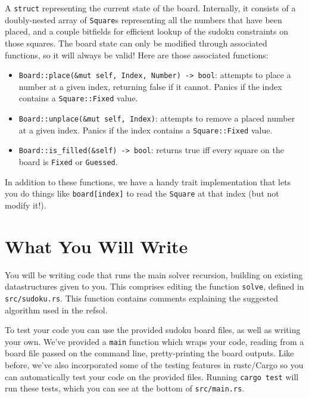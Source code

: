 \documentclass{article}
\begin{document}
A \texttt{struct} representing the current state of the board. Internally, it consists of a doubly-nested array of \texttt{Square}s representing all the numbers that have been placed, and a couple bitfields for efficient lookup of the sudoku constraints on those squares. The board state can only be modified through associated functions, so it will always be valid! Here are those associated functions:
\begin{itemize}
    \item \texttt{Board::place(\&mut self, Index, Number) -> bool}: attempts to place a number at a given index, returning false if it cannot. Panics if the index contains a \texttt{Square::Fixed} value.
    \item \texttt{Board::unplace(\&mut self, Index)}: attempts to remove a placed number at a given index. Panics if the index contains a \texttt{Square::Fixed} value.
    \item \texttt{Board::is\_filled(\&self) -> bool}: returns true iff every square on the board is \texttt{Fixed} or \texttt{Guessed}.
\end{itemize}

In addition to these functions, we have a handy trait implementation that lets you do things like \texttt{board[index]} to read the \texttt{Square} at that index (but not modify it!).

\section*{What You Will Write}

You will be writing code that runs the main solver recursion, building on existing datastructures given to you. This comprises editing the function \texttt{solve}, defined in \texttt{src/sudoku.rs}. This function contains comments explaining the suggested algorithm used in the refsol.

To test your code you can use the provided sudoku board files, as well as writing your own. We've provided a \texttt{main} function which wraps your code, reading from a board file passed on the command line, pretty-printing the board outputs. Like before, we've also incorporated some of the testing features in rustc/Cargo so you can automatically test your code on the provided files. Running \texttt{cargo test} will run these tests, which you can see at the bottom of \texttt{src/main.rs}.
\end{document}
